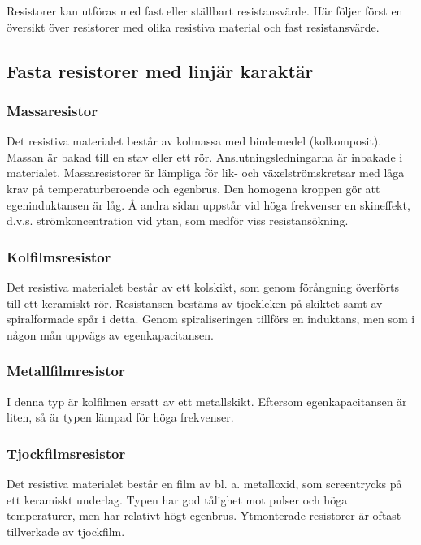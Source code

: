 Resistorer kan utföras med fast eller ställbart resistansvärde. Här följer
först en översikt över resistorer med olika resistiva material och fast
resistansvärde.

\subsection{Fasta resistorer med linjär karaktär}

\subsubsection{Massaresistor}

Det resistiva materialet består av kolmassa med bindemedel (kolkomposit).
Massan är bakad till en stav eller ett rör. Anslutningsledningarna är inbakade
i materialet. Massaresistorer är lämpliga för lik- och växelströmskretsar med
låga krav på temperaturberoende och egenbrus. Den homogena kroppen gör att
egeninduktansen är låg. Å andra sidan uppstår vid höga frekvenser en
skineffekt, d.v.s. strömkoncentration vid ytan, som medför viss resistansökning.

\subsubsection{Kolfilmsresistor}

Det resistiva materialet består av ett kolskikt, som genom förångning överförts
till ett keramiskt rör. Resistansen bestäms av tjockleken på skiktet samt av
spiralformade spår i detta. Genom spiraliseringen tillförs en induktans, men
som i någon mån uppvägs av egenkapacitansen.

\subsubsection{Metallfilmresistor}

I denna typ är kolfilmen ersatt av ett metallskikt. Eftersom egenkapacitansen
är liten, så är typen lämpad för höga frekvenser.

\subsubsection{Tjockfilmsresistor}

Det resistiva materialet består en film av bl. a. metalloxid, som screentrycks
på ett keramiskt underlag. Typen har god tålighet mot pulser och höga
temperaturer, men har relativt högt egenbrus. Ytmonterade resistorer är oftast
tillverkade av tjockfilm.

